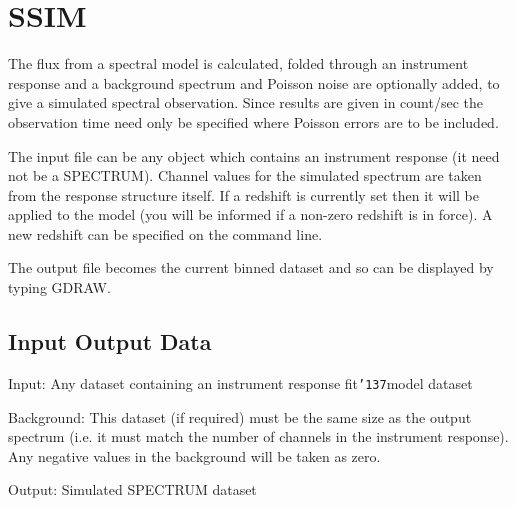 \documentclass{book}
\renewcommand{\_}{{\tt\char'137}}     %
\begin{document}
\section{SSIM}
The flux from a spectral model is calculated, folded through
an instrument response and a background spectrum and Poisson
noise are optionally added, to give a simulated spectral
observation. Since results are given in count/sec the
observation time need only be specified where Poisson errors
are to be included.
 
The input file can be any object which contains an
instrument response (it need not be a SPECTRUM). Channel
values for the simulated spectrum are taken from the response
structure itself. If a redshift is currently set then it will
be applied to the model (you will be informed if a non-zero
redshift is in force). A new redshift can be specified on the
command line.
 
The output file becomes the current binned dataset
and so can be displayed by typing GDRAW.
 
\subsection{Input Output Data}
Input: Any dataset containing an instrument response
fit\_model dataset
 
Background: This dataset (if required) must be the same size
as the output spectrum (i.e. it must match the
number of channels in the instrument response).
Any negative values in the background will be taken
as zero.
 
Output: Simulated SPECTRUM dataset
 
\end{document}
